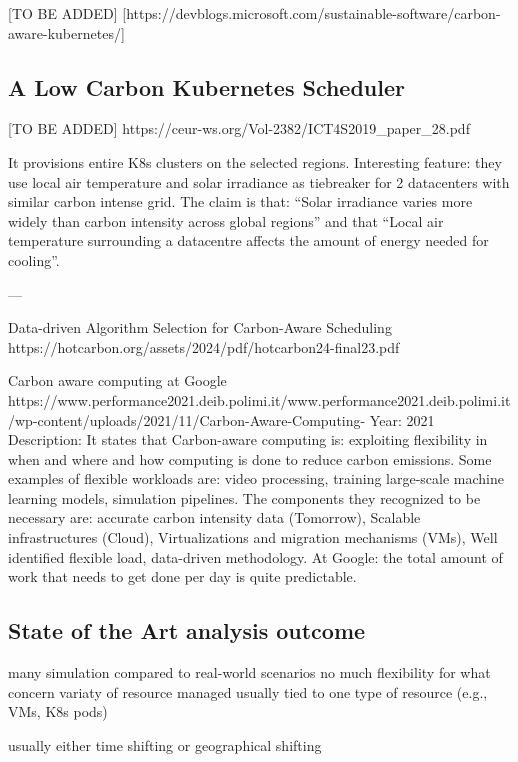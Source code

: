 [TO BE ADDED]
[https://devblogs.microsoft.com/sustainable-software/carbon-aware-kubernetes/]


\subsection{A Low Carbon Kubernetes Scheduler}
[TO BE ADDED]
https://ceur-ws.org/Vol-2382/ICT4S2019_paper_28.pdf

It provisions entire K8s clusters on the selected regions.
Interesting feature: they use local air temperature and solar irradiance as tiebreaker for 2 datacenters with similar carbon intense grid. The claim is that: “Solar irradiance varies more widely than carbon intensity across global regions” and that “Local air temperature surrounding a datacentre affects the amount of energy needed for cooling”. 


---

Data-driven Algorithm Selection for Carbon-Aware Scheduling
https://hotcarbon.org/assets/2024/pdf/hotcarbon24-final23.pdf


Carbon aware computing at Google
https://www.performance2021.deib.polimi.it/www.performance2021.deib.polimi.it/wp-content/uploads/2021/11/Carbon-Aware-Computing-%
Year: 2021
Description: 
It states that Carbon-aware computing is: exploiting flexibility in when and where and how computing is done to reduce carbon emissions.
Some examples of flexible workloads are: video processing, training large-scale machine learning models, simulation pipelines.
The components they recognized to be necessary are: accurate carbon intensity data (Tomorrow), Scalable infrastructures (Cloud), Virtualizations and migration mechanisms (VMs), Well identified flexible load, data-driven methodology.
At Google: the total amount of work that needs to get done per day is quite predictable.



\subsection{State of the Art analysis outcome}

many simulation compared to real-world scenarios
no much flexibility for what concern variaty of resource managed
usually tied to one type of resource (e.g., VMs, K8s pods)

usually either time shifting or geographical shifting

\newpage
